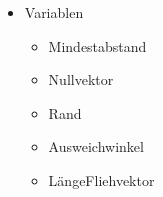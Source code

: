 \begin{itemize}
	\item Variablen
	\begin{itemize}
		\item Mindestabstand
		\item Nullvektor
		\item Rand
		\item Ausweichwinkel
		\item LängeFliehvektor
	\end{itemize}
\end{itemize}